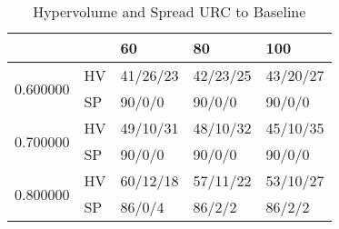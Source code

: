 \begin{table}
\caption{Hypervolume and Spread URC to Baseline}
\begin{tabular}{lllll}
\toprule
 &  & 60 & 80 & 100 \\
\midrule
\multirow[t]{2}{*}{0.600000} & HV & 41/26/23 & 42/23/25 & 43/20/27 \\
 & SP & 90/0/0 & 90/0/0 & 90/0/0 \\
\cline{1-5}
\multirow[t]{2}{*}{0.700000} & HV & 49/10/31 & 48/10/32 & 45/10/35 \\
 & SP & 90/0/0 & 90/0/0 & 90/0/0 \\
\cline{1-5}
\multirow[t]{2}{*}{0.800000} & HV & 60/12/18 & 57/11/22 & 53/10/27 \\
 & SP & 86/0/4 & 86/2/2 & 86/2/2 \\
\cline{1-5}
\bottomrule
\end{tabular}
\end{table}
